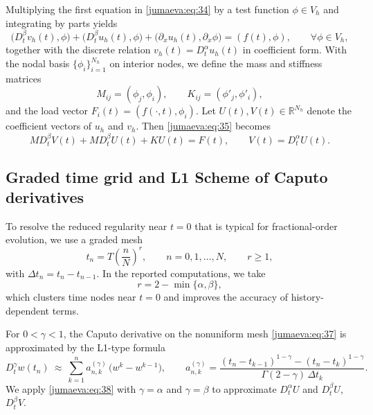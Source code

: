 \documentclass{amsart}
\numberwithin{equation}{section}
\begin{document}
Multiplying the first equation in \eqref{jumaeva:eq:34} by a test function $\phi\in V_h$ and integrating by parts yields
\begin{equation}
\big(D_t^\beta v_h(t),\phi\big) + \big(D_t^\beta u_h(t),\phi\big) + \big(\partial_x u_h(t),\partial_x \phi\big)
= (f(t),\phi),\qquad \forall \phi\in V_h,\label{jumaeva:eq:35}
\end{equation}
together with the discrete relation $v_h(t)=D_t^\alpha u_h(t)$ in coefficient form.
With the nodal basis $\{\phi_i\}_{i=1}^{N_h}$ on interior nodes, we define the mass and stiffness matrices
\begin{equation*}
M_{ij}=(\phi_j,\phi_i),\qquad K_{ij}=(\phi'_j,\phi'_i),
\end{equation*}
and the load vector $F_i(t)=(f(\cdot,t),\phi_i)$.
Let $U(t),V(t)\in\mathbb{R}^{N_h}$ denote the coefficient vectors of $u_h$ and $v_h$.
Then \eqref{jumaeva:eq:35} becomes
\begin{equation}
M D_t^\beta V(t) + M D_t^\beta U(t) + K U(t) = F(t),\qquad V(t)=D_t^\alpha U(t).\label{jumaeva:eq:36}
\end{equation}

\subsection{Graded time grid and L1 Scheme of Caputo derivatives}
To resolve the reduced regularity near $t=0$ that is typical for fractional-order evolution, we use a graded mesh
\begin{equation}
t_n = T\left(\frac{n}{N}\right)^r,\qquad n=0,1,\dots,N,\qquad r\ge 1,\label{jumaeva:eq:37}
\end{equation}
with $\Delta t_n=t_n-t_{n-1}$.
In the reported computations, we take 
\begin{equation*}
r = 2-\min\{\alpha,\beta\} ,
\end{equation*}
which clusters time nodes near $t=0$ and improves the accuracy of history-dependent terms.

For $0<\gamma<1$, the Caputo derivative on the nonuniform mesh \eqref{jumaeva:eq:37} is approximated by the L1-type formula
\begin{equation}
D_t^\gamma w(t_n)\ \approx\  \sum_{k=1}^{n} a^{(\gamma)}_{n,k}\,\big(w^k-w^{k-1}\big),
\qquad
a^{(\gamma)}_{n,k}=
\frac{(t_n-t_{k-1})^{1-\gamma}-(t_n-t_k)^{1-\gamma}}{\Gamma(2-\gamma)\,\Delta t_k}.\label{jumaeva:eq:38}
\end{equation}
We apply \eqref{jumaeva:eq:38} with $\gamma=\alpha$ and $\gamma=\beta$ to approximate $D_t^\alpha U$ and $D_t^\beta U$, $D_t^\beta V$.
\end{document}

